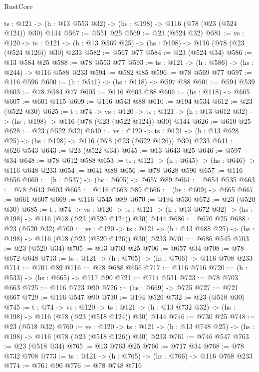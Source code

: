 \begin{lexlean}{RustCore}
\begin{coremodule}
  {ts : @121} -> (h : @13 @553 @32) -> (hs : @198) -> @116 (@78 (@23 (@524 @124)) @30) @144
@567 := @551 @25
@569 := @23 (@524 @32)
@581 := {vs : @120} ->
  {ts : @121} -> (h : @13 @569 @25) -> (hs : @198) -> @116 (@78 (@23 (@524 @126)) @30) @233
@582 := @567 @77
@584 := @23 (@524 @34)
@586 := @13 @584 @25
@588 := @78 @553 @77
@593 := {ts : @121} -> (h : @586) -> (hs : @244) -> @116 @588 @233
@594 := @582 @85
@596 := @78 @569 @77
@597 := @116 @596
@600 := (h : @541) -> (hs : @118) -> @597 @88
@601 := @594 @539
@603 := @78 @584 @77
@605 := @116 @603 @88
@606 := (hs : @118) -> @605
@607 := @601 @115
@609 := @116 @543 @88
@610 := @194 @534
@612 := @23 (@522 @30)
@625 := {t : @74} ->
  {vs : @120} ->
  {ts : @121} -> (h : @13 @612 @32) -> (hs : @198) -> @116 (@78 (@23 (@522 @124)) @30) @144
@626 := @610 @25
@628 := @23 (@522 @32)
@640 := {vs : @120} ->
  {ts : @121} -> (h : @13 @628 @25) -> (hs : @198) -> @116 (@78 (@23 (@522 @126)) @30) @233
@641 := @626 @543
@643 := @23 (@522 @34)
@645 := @13 @643 @25
@646 := @597 @34
@648 := @78 @612 @588
@653 := {ts : @121} -> (h : @645) -> (hs : @646) -> @116 @648 @233
@654 := @641 @88
@656 := @78 @628 @596
@657 := @116 @656
@660 := (h : @537) -> (hs : @605) -> @657 @89
@661 := @654 @535
@663 := @78 @643 @603
@665 := @116 @663 @89
@666 := (hs : @609) -> @665
@667 := @661 @607
@669 := @116 @545 @89
@670 := @194 @530
@672 := @23 (@520 @30)
@685 := {t : @74} ->
  {vs : @120} ->
  {ts : @121} -> (h : @13 @672 @32) -> (hs : @198) -> @116 (@78 (@23 (@520 @124)) @30) @144
@686 := @670 @25
@688 := @23 (@520 @32)
@700 := {vs : @120} ->
  {ts : @121} -> (h : @13 @688 @25) -> (hs : @198) -> @116 (@78 (@23 (@520 @126)) @30) @233
@701 := @686 @545
@703 := @23 (@520 @34)
@705 := @13 @703 @25
@706 := @657 @34
@708 := @78 @672 @648
@713 := {ts : @121} -> (h : @705) -> (hs : @706) -> @116 @708 @233
@714 := @701 @89
@716 := @78 @688 @656
@717 := @116 @716
@720 := (h : @533) -> (hs : @665) -> @717 @90
@721 := @714 @531
@723 := @78 @703 @663
@725 := @116 @723 @90
@726 := (hs : @669) -> @725
@727 := @721 @667
@729 := @116 @547 @90
@730 := @194 @526
@732 := @23 (@518 @30)
@745 := {t : @74} ->
  {vs : @120} ->
  {ts : @121} -> (h : @13 @732 @32) -> (hs : @198) -> @116 (@78 (@23 (@518 @124)) @30) @144
@746 := @730 @25
@748 := @23 (@518 @32)
@760 := {vs : @120} ->
  {ts : @121} -> (h : @13 @748 @25) -> (hs : @198) -> @116 (@78 (@23 (@518 @126)) @30) @233
@761 := @746 @547
@763 := @23 (@518 @34)
@765 := @13 @763 @25
@766 := @717 @34
@768 := @78 @732 @708
@773 := {ts : @121} -> (h : @765) -> (hs : @766) -> @116 @768 @233
@774 := @761 @90
@776 := @78 @748 @716

\end{coremodule}
\end{lexlean}
